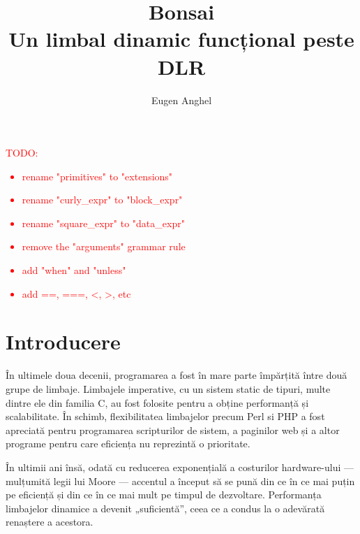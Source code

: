 \documentclass[12pt,a4paper]{memoir}
\title{Bonsai\\Un limbal dinamic funcțional peste DLR}
\author{Eugen Anghel}
\begin{document}
\newcommand{\draft}{\textcolor{red}}

\renewcommand{\thefootnote}{\fnsymbol{footnote}}

\renewcommand{\c}{\texttt}

\newenvironment{code}
{
\definecolor{shadecolor}{gray}{0.91}
\topsep=0ex
\relax
\shaded
\verbatim
}
{
\endverbatim
\endshaded
}

\maketitle

\draft{TODO:
  \begin{itemize}
    \item rename "primitives" to "extensions"
    \item rename "curly\_expr" to "block\_expr"
    \item rename "square\_expr" to "data\_expr"
    \item remove the "arguments" grammar rule
    \item add "when" and "unless"
    \item add ==, ===, <, >, etc
  \end{itemize}
}

\newpage
\tableofcontents

\chapter{Introducere}

În ultimele doua decenii, programarea a fost în mare parte împărțită între două grupe de limbaje. Limbajele imperative, cu un sistem static de tipuri, multe dintre ele din familia C, au fost folosite pentru a obține performanță și scalabilitate. În schimb, flexibilitatea limbajelor precum Perl si PHP a fost apreciată pentru programarea scripturilor de sistem, a paginilor web și a altor programe pentru care eficiența nu reprezintă o prioritate.

În ultimii ani însă, odată cu reducerea exponențială a costurilor hardware-ului — mulțumită legii lui Moore — accentul a început să se pună din ce în ce mai puțin pe eficiență și din ce în ce mai mult pe timpul de dezvoltare. Performanța limbajelor dinamice a devenit „suficientă”, ceea ce a condus la o adevărată renaștere a acestora.
\end{document}
